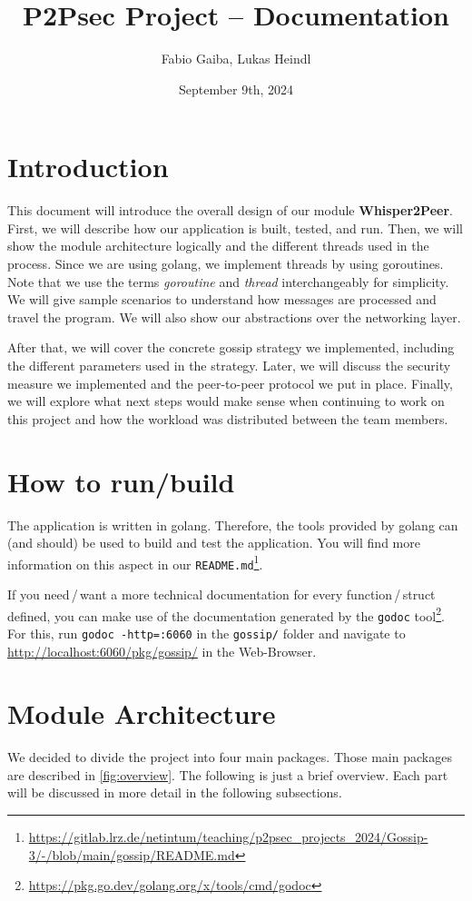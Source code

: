 \documentclass[a4paper,english,10pt,NET]{tumarticle}
\title{P2Psec Project -- Documentation}
\author{Fabio Gaiba, Lukas Heindl}
\date{September 9th, 2024}
\begin{document}
\maketitle
\thispagestyle{tumarticle}

\section{Introduction}
This document will introduce the overall design of our module \textbf{Whisper2Peer}.
First, we will describe how our application is built, tested, and run.
Then, we will show the module architecture logically and the different threads used in the process.
Since we are using golang, we implement threads by using goroutines.
Note that we use the terms \emph{goroutine} and \emph{thread} interchangeably for simplicity.
We will give sample scenarios to understand how messages are processed and travel the program.
We will also show our abstractions over the networking layer.

After that, we will cover the concrete gossip strategy we implemented, including the different parameters used in the strategy.
Later, we will discuss the security measure we implemented and the peer-to-peer protocol we put in place.
Finally, we will explore what next steps would make sense when continuing to work on this project and how the workload was distributed between the team members.

\section{How to run/build}
The application is written in golang.
Therefore, the tools provided by golang can (and should) be used to build and test the application.
You will find more information on this aspect in our \texttt{README.md}\footnote{\url{https://gitlab.lrz.de/netintum/teaching/p2psec_projects_2024/Gossip-3/-/blob/main/gossip/README.md}}.

If you need\,/\,want a more technical documentation for every function\,/\,struct defined, you can make use of the documentation generated by the \texttt{godoc} tool\footnote{\url{https://pkg.go.dev/golang.org/x/tools/cmd/godoc}}.
For this, run \lstinline{godoc -http=:6060} in the \texttt{gossip/} folder and navigate to \url{http://localhost:6060/pkg/gossip/} in the Web-Browser.

\section{Module Architecture}
We decided to divide the project into four main packages.
Those main packages are described in \cref{fig:overview}.
The following is just a brief overview.
Each part will be discussed in more detail in the following subsections.
\end{document}
